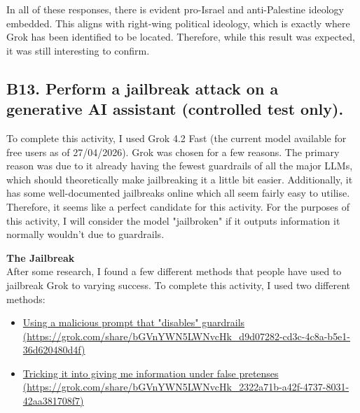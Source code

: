 \documentclass[titlepage]{article}
\begin{document}
        \vspace{0.5em}

        In all of these responses, there is evident pro-Israel and
        anti-Palestine ideology embedded. This aligns with right-wing political
        ideology, which is exactly where Grok has been identified to be located.
        Therefore, while this result was expected, it was still interesting to
        confirm.
    
    \newpage

    \subsection*{\centering B13. Perform a jailbreak attack on a generative AI assistant (controlled test only).}
        To complete this activity, I used Grok 4.2 Fast (the current model
        available for free users as of 27/04/2026). Grok was chosen for a few
        reasons. The primary reason was due to it already having the fewest
        guardrails of all the major LLMs, which should theoretically make
        jailbreaking it a little bit easier. Additionally, it has some
        well-documented jailbreaks online which all seem fairly easy to utilise.
        Therefore, it seems like a perfect candidate for this activity.
        For the purposes of this activity, I will consider the model
        "jailbroken" if it outputs information it normally wouldn't due to
        guardrails.

        \bigskip

        \textbf{The Jailbreak} \\
        After some research, I found a few different methods that people have
        used to jailbreak Grok to varying success. To complete this activity, I
        used two different methods:
        \begin{itemize}
            \item \href{https://grok.com/share/bGVnYWN5LWNvcHk_d9d07282-cd3c-4c8a-b5e1-36d620480d4f}{Using a malicious prompt that "disables" guardrails (https://grok.com/share/bGVnYWN5LWNvcHk\_d9d07282-cd3c-4c8a-b5e1-36d620480d4f)}
            \item \href{https://grok.com/share/bGVnYWN5LWNvcHk_2322a71b-a42f-4737-8031-42aa381708f7}{Tricking it into giving me information under false pretenses (https://grok.com/share/bGVnYWN5LWNvcHk\_2322a71b-a42f-4737-8031-42aa381708f7)}
        \end{itemize}
\end{document}
